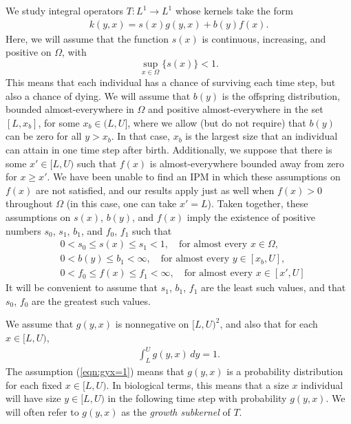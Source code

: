 We study integral operators $T:L^1 \to L^1$ whose kernels take the form
\begin{align}
	k(y,x) = s(x) g(y,x) + b(y) f(x). \label{eqn:kernel}
\end{align}
Here, we will assume that the function $s(x)$ is continuous, increasing, and positive on $\Omega$, with 
\[\sup_{x \in \Omega} \{s(x)\} < 1.\]
This means that each individual has a chance of surviving each time step, but also a chance of dying. We will assume that $b(y)$ is the offspring distribution, bounded almost-everywhere in $\Omega$ and positive almost-everywhere in the set $[L, x_b]$, for some $x_b \in (L,U]$, where we allow (but do not require) that $b(y)$ can be zero for all $y > x_b$. In that case, $x_b$ is the largest size that an individual can attain in one time step after birth. Additionally, we suppose that there is some $x' \in [L, U)$ such that $f(x)$ is almost-everywhere bounded away from zero for $x \geq x'$. We have been unable to find an IPM in which these assumptions on $f(x)$ are not satisfied, and our results apply just as well when $f(x) > 0$ throughout $\Omega$ (in this case, one can take $x' = L$). Taken together, these assumptions on $s(x)$, $b(y)$, and $f(x)$ imply the existence of positive numbers $s_0$, $s_1$, $b_1$, and $f_0$, $f_1$ such that
\begin{align}
	&0 < s_0 \leq s(x) \leq s_1 < 1, \quad \text{for almost every } x \in \Omega, \label{eqn:s(x)bounds} \\
	&0 < b(y) \leq b_1 < \infty, \quad \text{for almost every } y \in [x_b, U], \label{eqn:b(y)bounds} \\
	&0 < f_0 \leq f(x) \leq f_1 < \infty, \quad \text{for almost every } x \in [x', U] \label{eqn:f(x)bounds}
\end{align}
It will be convenient to assume that $s_1$, $b_1$, $f_1$ are the least such values, and that $s_0$, $f_0$ are the greatest such values.

We assume that $g(y,x)$ is nonnegative on $[L,U)^2$, and also that for each $x \in [L,U)$,
\begin{align}\int_L^U g(y,x) \, dy = 1. \label{eqn:gyx=1}\end{align}
The assumption (\ref{eqn:gyx=1}) means that $g(y,x)$ is a probability distribution for each fixed $x \in [L, U)$. In biological terms, this means that a size $x$ individual will have size $y \in [L,U)$ in the following time step with probability $g(y, x)$. We will often refer to $g(y,x)$ as the \emph{growth subkernel} of $T$.

